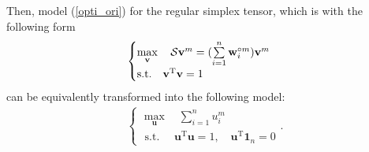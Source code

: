 Then,  model   (\ref{opti_ori})   for the regular simplex tensor, which is with the following form 
 \begin{align}\label{optmodelori}
\begin{cases}
\max\limits_{\mathbf v} \quad \mathcal S \mathbf v^{m} 
=
(\sum\limits_{i=1}^{n} \mathbf{w}_{i}^{\circ m}) \mathbf v^{m}   \\
\rm s.t. \quad \mathbf v^{\mathrm {T}}\mathbf v=1
\end{cases}
\end{align}
  can  be  equivalently    transformed into the following 
 model:  
 \begin{align}\label{optmodel}
 \begin{cases}
 \max\limits_{\mathbf u}  \quad  \sum\limits_{i=1}^{n}  u_{i}^{m} 
  \\
 \text { s.t. }   \quad    
 \mathbf   u^{\mathrm T}   \mathbf   u =1 ,
 \quad  
 \mathbf   u^{\mathrm T}   \mathbf   1_{n} =0
 \end{cases} .
 \end{align}
 
% 
% 
% 
 
